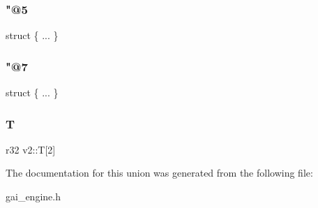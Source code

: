 \subsubsection{\texorpdfstring{"@5}{@5}}
{\footnotesize\ttfamily struct \{ ... \} }

\mbox{\label{unionv2_abaa590c45431f6a06750196f8775a60f}} 
\subsubsection{\texorpdfstring{"@7}{@7}}
{\footnotesize\ttfamily struct \{ ... \} }

\mbox{\label{unionv2_a64c84ca2180167d5b2966dc34c4396a7}} 
\subsubsection{\texorpdfstring{T}{T}}
{\footnotesize\ttfamily r32 v2\+::T\mbox{[}2\mbox{]}}



The documentation for this union was generated from the following file\+:\begin{DoxyCompactItemize}
\item 
gai\+\_\+engine.\+h\end{DoxyCompactItemize}
